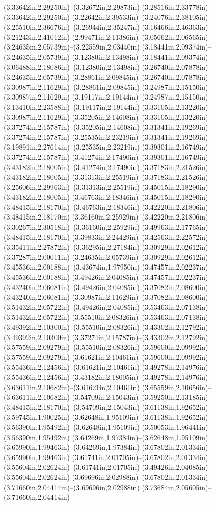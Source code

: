 (3.33642in,2.29250in)--(3.32672in,2.29873in) (3.28516in,2.33778in)--(3.33642in,2.29250in) (3.22642in,2.39533in)--(3.24076in,2.38105in) (3.25510in,2.36676in)--(3.26944in,2.35247in) (3.16466in,2.46363in)--(3.21243in,2.41012in) (2.99471in,2.11386in)--(3.05662in,2.06565in) (3.24635in,2.05739in)--(3.22559in,2.03440in) (3.18441in,2.09374in)--(3.24635in,2.05739in) (3.12380in,2.13498in)--(3.18441in,2.09374in) (3.06488in,2.18086in)--(3.12380in,2.13498in) (3.26740in,2.07878in)--(3.24635in,2.05739in) (3.28861in,2.09845in)--(3.26740in,2.07878in) (3.30987in,2.11629in)--(3.28861in,2.09845in) (3.24987in,2.15150in)--(3.30987in,2.11629in) (3.19117in,2.19144in)--(3.24987in,2.15150in) (3.13410in,2.23588in)--(3.19117in,2.19144in) (3.33105in,2.13220in)--(3.30987in,2.11629in) (3.35205in,2.14608in)--(3.33105in,2.13220in) (3.37274in,2.15787in)--(3.35205in,2.14608in) (3.31341in,2.19269in)--(3.37274in,2.15787in) (3.25535in,2.23219in)--(3.31341in,2.19269in) (3.19891in,2.27614in)--(3.25535in,2.23219in) (3.39301in,2.16749in)--(3.37274in,2.15787in) (3.41274in,2.17490in)--(3.39301in,2.16749in) (3.43182in,2.18005in)--(3.41274in,2.17490in) (3.37183in,2.21526in)--(3.43182in,2.18005in) (3.31313in,2.25519in)--(3.37183in,2.21526in) (3.25606in,2.29963in)--(3.31313in,2.25519in) (3.45015in,2.18290in)--(3.43182in,2.18005in) (3.46763in,2.18346in)--(3.45015in,2.18290in) (3.48415in,2.18170in)--(3.46763in,2.18346in) (3.42220in,2.21806in)--(3.48415in,2.18170in) (3.36160in,2.25929in)--(3.42220in,2.21806in) (3.30267in,2.30518in)--(3.36160in,2.25929in) (3.49963in,2.17765in)--(3.48415in,2.18170in) (3.39833in,2.24429in)--(3.42563in,2.22572in) (3.35411in,2.27872in)--(3.36295in,2.27184in) (3.30929in,2.02612in)--(3.37287in,2.00011in) (3.24635in,2.05739in)--(3.30929in,2.02612in) (3.45536in,2.00188in)--(3.43674in,1.97950in) (3.47457in,2.02237in)--(3.45536in,2.00188in) (3.49426in,2.04085in)--(3.47457in,2.02237in) (3.43240in,2.06081in)--(3.49426in,2.04085in) (3.37082in,2.08600in)--(3.43240in,2.06081in) (3.30987in,2.11629in)--(3.37082in,2.08600in) (3.51432in,2.05722in)--(3.49426in,2.04085in) (3.53463in,2.07138in)--(3.51432in,2.05722in) (3.55510in,2.08326in)--(3.53463in,2.07138in) (3.49392in,2.10300in)--(3.55510in,2.08326in) (3.43302in,2.12792in)--(3.49392in,2.10300in) (3.37274in,2.15787in)--(3.43302in,2.12792in) (3.57559in,2.09279in)--(3.55510in,2.08326in) (3.59600in,2.09992in)--(3.57559in,2.09279in) (3.61621in,2.10461in)--(3.59600in,2.09992in) (3.55436in,2.12456in)--(3.61621in,2.10461in) (3.49278in,2.14976in)--(3.55436in,2.12456in) (3.43182in,2.18005in)--(3.49278in,2.14976in) (3.63611in,2.10682in)--(3.61621in,2.10461in) (3.65559in,2.10656in)--(3.63611in,2.10682in) (3.54709in,2.15043in)--(3.59250in,2.13185in) (3.48415in,2.18170in)--(3.54709in,2.15043in) (3.61138in,1.92652in)--(3.59745in,1.90025in) (3.62648in,1.95109in)--(3.61138in,1.92652in) (3.56390in,1.95492in)--(3.62648in,1.95109in) (3.50053in,1.96441in)--(3.56390in,1.95492in) (3.64269in,1.97384in)--(3.62648in,1.95109in) (3.65990in,1.99463in)--(3.64269in,1.97384in) (3.67802in,2.01334in)--(3.65990in,1.99463in) (3.61741in,2.01705in)--(3.67802in,2.01334in) (3.55604in,2.02624in)--(3.61741in,2.01705in) (3.49426in,2.04085in)--(3.55604in,2.02624in) (3.69696in,2.02988in)--(3.67802in,2.01334in) (3.71660in,2.04414in)--(3.69696in,2.02988in) (3.73684in,2.05605in)--(3.71660in,2.04414in) 